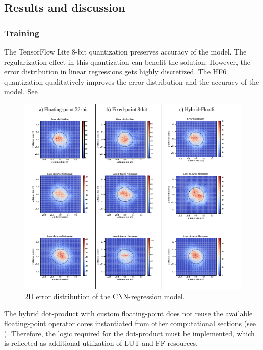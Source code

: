 \subsection{Results and discussion}
\subsubsection{Training}
The TensorFlow Lite 8-bit quantization preserves accuracy of the model. The regularization effect in this quantization can benefit the solution. However, the error distribution in linear regressions gets highly discretized. The HF6 quantization qualitatively improves the error distribution and the accuracy of the model. See .

\begin{figure}[t!]
	\centering
	\includegraphics[width=1\columnwidth]{../figures/histograms/2D_error_distribtion.pdf}
	\caption{2D error distribution of the CNN-regression model.}
	\label{fig:2d_error_distribtion}
\end{figure}

The hybrid dot-product with custom floating-point does not reuse the available floating-point operator cores instantiated from other computational sections (see {}). Therefore, the logic required for the dot-product must be implemented, which is reflected as additional utilization of LUT and FF resources.


